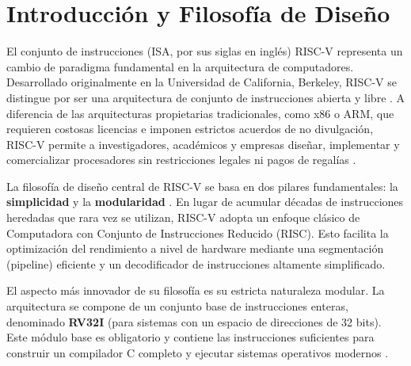 

\label{chp:RV32I_ISA}

\section{Introducción y Filosofía de Diseño}
\label{sec:IntroFilosofia}

El conjunto de instrucciones (ISA, por sus siglas en inglés) RISC-V representa un cambio de paradigma fundamental en la arquitectura de computadores. Desarrollado originalmente en la Universidad de California, Berkeley, RISC-V se distingue por ser una arquitectura de conjunto de instrucciones abierta y libre \cite{waterman2014riscv}. A diferencia de las arquitecturas propietarias tradicionales, como x86 o ARM, que requieren costosas licencias e imponen estrictos acuerdos de no divulgación, RISC-V permite a investigadores, académicos y empresas diseñar, implementar y comercializar procesadores sin restricciones legales ni pagos de regalías \cite{asanovic2014instruction}.

La filosofía de diseño central de RISC-V se basa en dos pilares fundamentales: la \textbf{simplicidad} y la \textbf{modularidad} \cite{patterson2017riscv}. En lugar de acumular décadas de instrucciones heredadas que rara vez se utilizan, RISC-V adopta un enfoque clásico de Computadora con Conjunto de Instrucciones Reducido (RISC). Esto facilita la optimización del rendimiento a nivel de hardware mediante una segmentación (pipeline) eficiente y un decodificador de instrucciones altamente simplificado.

El aspecto más innovador de su filosofía es su estricta naturaleza modular. La arquitectura se compone de un conjunto base de instrucciones enteras, denominado \textbf{RV32I} (para sistemas con un espacio de direcciones de 32 bits). Este módulo base es obligatorio y contiene las instrucciones suficientes para construir un compilador C completo y ejecutar sistemas operativos modernos \cite{waterman2014riscv}. 

